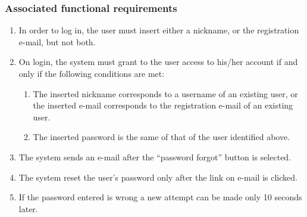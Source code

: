 \subsubsection{Associated functional requirements}
\begin{enumerate}
    \item In order to log in, the user must insert either a nickname, or the registration e-mail, but not both.
    \item On login, the system must grant to the user access to his/her account if and only if the following conditions are met:
    \begin{enumerate} 
    	\item The inserted nickname corresponds to a username of an existing user, or the inserted e-mail corresponds to the registration e-mail of an existing user.
	\item The inserted password is the same of that of the user identified above.
    \end{enumerate}
    \item The system sends an e-mail after the ``password forgot'' button is selected.
    \item The system reset the user's password only after the link on e-mail is clicked.
    \item If the password entered is wrong a new attempt can be made only 10 seconds later.
  
\end{enumerate}